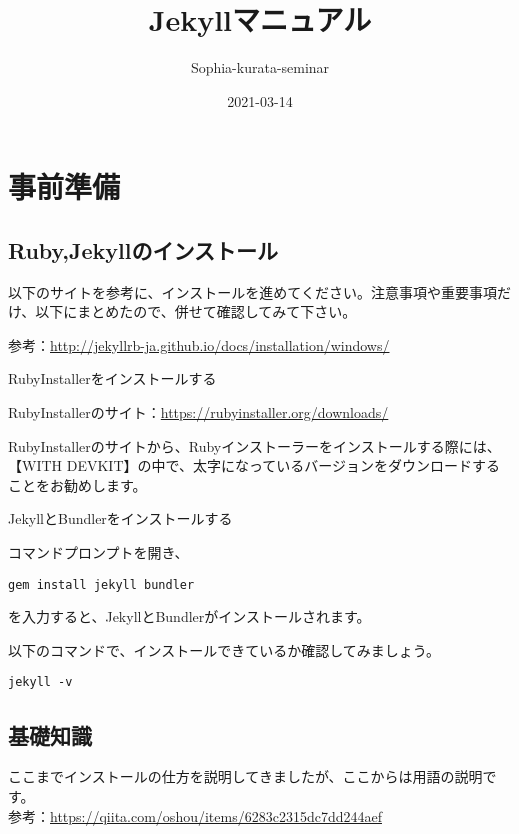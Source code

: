 \documentclass[
]{book}
\title{Jekyllマニュアル}
\author{Sophia-kurata-seminar}
\date{2021-03-14}
\begin{document}
\maketitle

{
\setcounter{tocdepth}{1}
\tableofcontents
}
\hypertarget{ux4e8bux524dux6e96ux5099}{%
\chapter*{事前準備}\label{ux4e8bux524dux6e96ux5099}}

\hypertarget{rubyjekyllux306eux30a4ux30f3ux30b9ux30c8ux30fcux30eb}{%
\section{Ruby,Jekyllのインストール}\label{rubyjekyllux306eux30a4ux30f3ux30b9ux30c8ux30fcux30eb}}

以下のサイトを参考に、インストールを進めてください。注意事項や重要事項だけ、以下にまとめたので、併せて確認してみて下さい。

参考：\url{http://jekyllrb-ja.github.io/docs/installation/windows/}

RubyInstallerをインストールする

RubyInstallerのサイト：\url{https://rubyinstaller.org/downloads/}

RubyInstallerのサイトから、Rubyインストーラーをインストールする際には、【WITH DEVKIT】の中で、太字になっているバージョンをダウンロードすることをお勧めします。

JekyllとBundlerをインストールする

コマンドプロンプトを開き、

\begin{verbatim}
gem install jekyll bundler
\end{verbatim}

を入力すると、JekyllとBundlerがインストールされます。

以下のコマンドで、インストールできているか確認してみましょう。

\begin{verbatim}
jekyll -v
\end{verbatim}

\hypertarget{ux57faux790eux77e5ux8b58}{%
\section{基礎知識}\label{ux57faux790eux77e5ux8b58}}

ここまでインストールの仕方を説明してきましたが、ここからは用語の説明です。\\
参考：\url{https://qiita.com/oshou/items/6283c2315dc7dd244aef}
\end{document}
